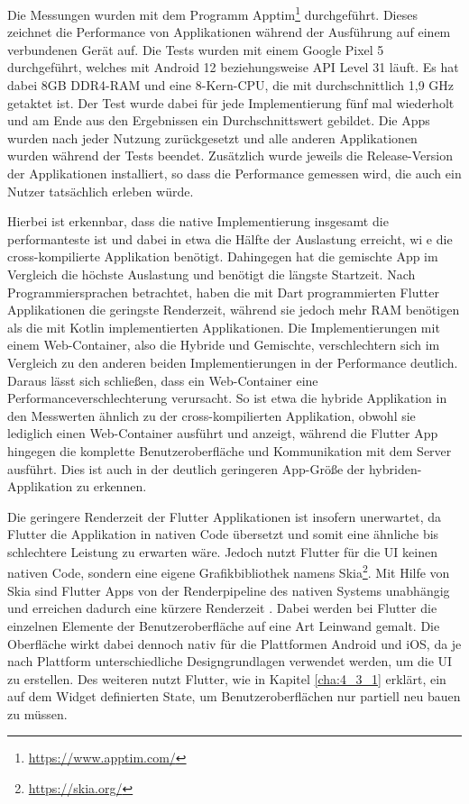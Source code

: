 Die Messungen wurden mit dem Programm Apptim\footnote{\url{https://www.apptim.com/}} durchgeführt. Dieses zeichnet die Performance von Applikationen während der Ausführung auf einem verbundenen Gerät auf. Die Tests wurden mit einem Google Pixel 5 durchgeführt, welches mit Android 12 beziehungsweise API Level 31 läuft. Es hat dabei 8GB DDR4-RAM und eine 8-Kern-CPU, die mit durchschnittlich 1,9 GHz getaktet ist.
Der Test wurde dabei für jede Implementierung fünf mal wiederholt und am Ende aus den Ergebnissen ein Durchschnittswert gebildet.
Die Apps wurden nach jeder Nutzung zurückgesetzt und alle anderen Applikationen wurden während der Tests beendet.
Zusätzlich wurde jeweils die Release-Version der Applikationen installiert, so dass die Performance gemessen wird, die auch ein Nutzer tatsächlich erleben würde.

Hierbei ist erkennbar, dass die native Implementierung insgesamt die performanteste ist und dabei in etwa die Hälfte der Auslastung erreicht, wi e die cross-kompilierte Applikation benötigt.
Dahingegen hat die gemischte App im Vergleich die höchste Auslastung und benötigt die längste Startzeit.
Nach Programmiersprachen betrachtet, haben die mit Dart programmierten Flutter Applikationen die geringste Renderzeit, während sie jedoch mehr RAM benötigen als die mit Kotlin implementierten Applikationen.
Die Implementierungen mit einem Web-Container, also die Hybride und Gemischte, verschlechtern sich im Vergleich zu den anderen beiden Implementierungen in der Performance deutlich. Daraus lässt sich schließen, dass ein Web-Container eine  Performanceverschlechterung verursacht. So ist etwa die hybride Applikation in den Messwerten ähnlich zu der cross-kompilierten Applikation, obwohl sie lediglich einen Web-Container ausführt und anzeigt, während die Flutter App hingegen die komplette Benutzeroberfläche und Kommunikation mit dem Server ausführt. Dies ist auch in der deutlich geringeren App-Größe der hybriden-Applikation zu erkennen.  

Die geringere Renderzeit der Flutter Applikationen ist insofern unerwartet, da Flutter die Applikation in nativen Code übersetzt und somit eine ähnliche bis schlechtere Leistung zu erwarten wäre. Jedoch nutzt Flutter für die UI keinen nativen Code, sondern eine eigene Grafikbibliothek namens Skia\footnote{\url{https://skia.org/}}. Mit Hilfe von Skia sind Flutter Apps von der Renderpipeline des nativen Systems unabhängig und erreichen dadurch eine kürzere Renderzeit \cite{Thiele_2018}. Dabei werden bei Flutter die einzelnen Elemente der Benutzeroberfläche auf eine Art Leinwand gemalt. Die Oberfläche wirkt dabei dennoch nativ für die Plattformen Android und iOS, da je nach Plattform unterschiedliche Designgrundlagen verwendet werden, um die UI zu erstellen\cite{jose_flutter}. Des weiteren nutzt Flutter, wie in Kapitel \ref{cha:4_3_1} erklärt, ein auf dem Widget definierten State, um Benutzeroberflächen nur partiell neu bauen zu müssen.

